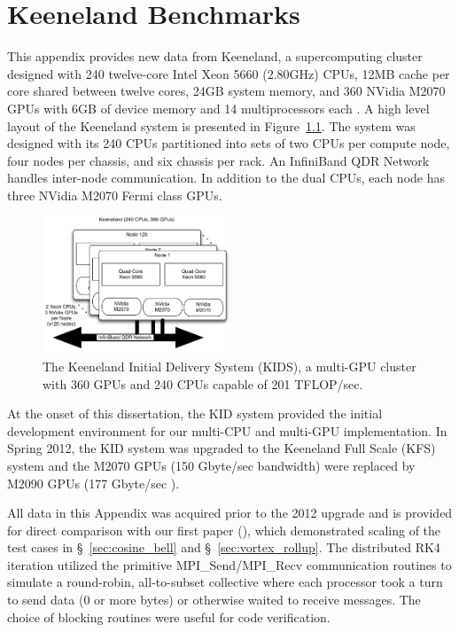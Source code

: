
\chapter{Keeneland Benchmarks}
\label{app:keeneland_alltoallv_benchmarks}

This appendix provides new data from Keeneland, a supercomputing cluster designed with 240 twelve-core Intel Xeon 5660 (2.80GHz) CPUs, 12MB cache per core shared between twelve cores, 24GB system memory, and 360 NVidia M2070 GPUs with 6GB of device memory and 14 multiprocessors each \cite{Vetter2011}.  A high level layout of the Keeneland system is presented in Figure~\ref{fig:keeneland}. The system was designed with its 240 CPUs partitioned into sets of two CPUs per compute node, four nodes per chassis, and six chassis per rack. An InfiniBand QDR Network handles inter-node communication. In addition to the dual CPUs, each node has three NVidia M2070 Fermi class GPUs.

\begin{figure}
\centering
\includegraphics[width=0.5\textwidth]{../figures/paper1/figures/omnigraffle/Keeneland.pdf}
\caption{The Keeneland Initial Delivery System (KIDS), a multi-GPU cluster with 360 GPUs and 240 CPUs capable of 201 TFLOP/sec.}
\label{fig:keeneland}
\end{figure}

At the onset of this dissertation, the KID system provided the initial development environment for our multi-CPU and multi-GPU implementation. In Spring 2012, the KID system was upgraded to the Keeneland Full Scale (KFS) system and the M2070 GPUs (150 Gbyte/sec bandwidth) were replaced by M2090 GPUs (177 Gbyte/sec \cite{M2090}). 

All data in this Appendix was acquired prior to the 2012 upgrade and is provided for direct comparison with our first paper (\cite{BolligFlyerErlebacher2012}), which demonstrated scaling of the test cases in \S~\ref{sec:cosine_bell} and \S~\ref{sec:vortex_rollup}. The distributed RK4 iteration utilized the primitive MPI\_Send/MPI\_Recv communication routines to simulate a round-robin, all-to-subset collective where each processor took a turn to send data (0 or more bytes) or otherwise waited to receive messages. The choice of blocking routines were useful for code verification. 

